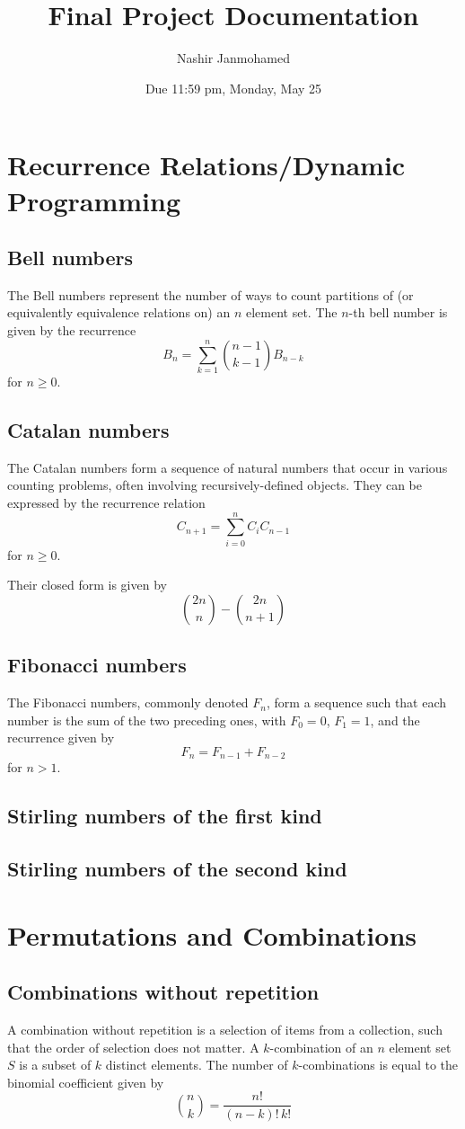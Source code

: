 \documentclass{article}
\title{Final Project Documentation}
\author{Nashir Janmohamed}
\date{Due 11:59 pm, Monday, May 25}
\begin{document}
\maketitle


\section{Recurrence Relations/Dynamic Programming}
\subsection{Bell numbers}
The Bell numbers represent the number of ways to count partitions of (or equivalently equivalence relations on) an $n$ element set. The $n$-th bell number is given by the recurrence
\[B_n = \sum_{k=1}^{n} {n-1 \choose k-1} B_{n-k}\]
for $n \ge 0$.
\subsection{Catalan numbers}
The Catalan numbers form a sequence of natural numbers that occur in various counting problems, often involving recursively-defined objects. They can be expressed by the recurrence relation
\[C_{n+1} = \sum_{i=0}^{n}C_iC_{n-1}\]
for $n \ge 0$.

\noindent Their closed form is given by
\[{2n \choose n} - {2n \choose n+1 }\]
\subsection{Fibonacci numbers}
The Fibonacci numbers, commonly denoted $F_n$, form a sequence such that each number is the sum of the two preceding ones, with $F_0 = 0$, $F_1 = 1$, and the recurrence given by
\[F_n = F_{n-1}+F_{n-2}\]
for $n > 1$.
\subsection{Stirling numbers of the first kind}
\subsection{Stirling numbers of the second kind}

\section{Permutations and Combinations}
\subsection{Combinations without repetition}
A combination without repetition is a selection of items from a collection, such that the order of selection does not matter. A $k$-combination of an $n$ element set $S$ is a subset of $k$ distinct elements. The number of $k$-combinations is equal to the binomial coefficient given by
\[{n \choose k} = \frac{n!}{(n-k)!\,k!}\]
\end{document}
